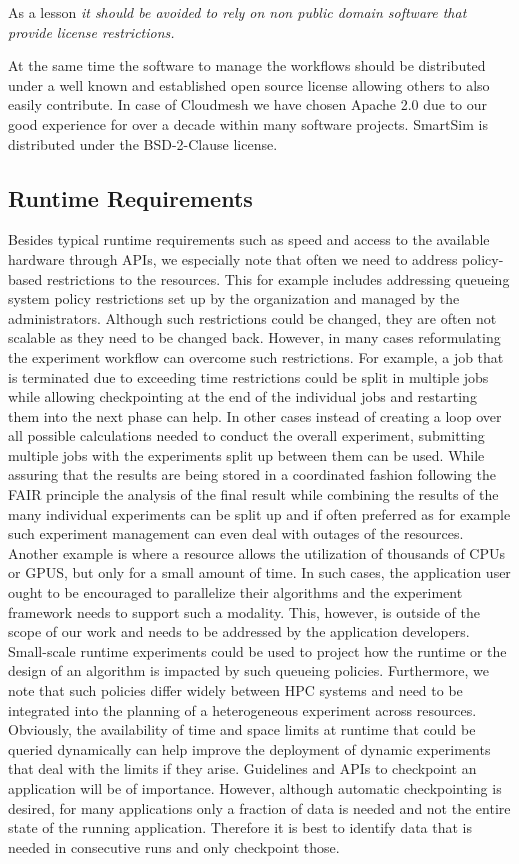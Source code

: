 \documentclass[utf8]{FrontiersinVancouver} %
\begin{document}
As a lesson {\em it should be avoided to rely on non public domain software that provide license restrictions.}

At the same time the software to manage the workflows should be distributed under a well known and established open source license allowing others to also easily contribute. In case of Cloudmesh we have chosen Apache 2.0 due to our good experience for over a decade within many software projects.
SmartSim is distributed under the BSD-2-Clause license.


\subsection{Runtime Requirements}

Besides typical runtime requirements such as speed and access to the available hardware through APIs, we especially note that often we need to address policy-based restrictions to the resources. This for example includes addressing queueing system policy restrictions set up by the organization and managed by the administrators. Although such restrictions could be changed, they are often not scalable as they need to be changed back. However, in many cases reformulating the experiment workflow can overcome such restrictions. For example, a job that is terminated due to exceeding time restrictions could be split in multiple jobs while allowing checkpointing at the end of the individual jobs and restarting them into the next phase can help. In other cases instead of creating a loop over all possible calculations needed to conduct the overall experiment, submitting multiple jobs with the experiments split up between them can be used. While assuring that the results are being stored in a coordinated fashion following the FAIR principle the analysis of the final result while combining the results of the many individual experiments can be split up and if often preferred as for example such experiment management can even deal with outages of the resources. Another example is where a resource allows the utilization of thousands of CPUs or GPUS, but only for a small amount of time. In such cases, the application user ought to be encouraged to parallelize their algorithms and the experiment framework needs to support such a modality. This, however, is outside of the scope of our work and needs to be addressed by the application developers. Small-scale runtime experiments could be used to project how the runtime or the design of an algorithm is impacted by such queueing policies.
Furthermore, we note that such policies differ widely between HPC systems and need to be integrated into the planning of a heterogeneous experiment across resources. Obviously, the availability of time and space limits at runtime that could be queried dynamically can help improve the deployment of dynamic experiments that deal with the limits if they arise. Guidelines and APIs to checkpoint an application will be of importance. However, although automatic checkpointing is desired, for many applications only a fraction of data is needed and not the entire state of the running application. Therefore it is best to identify data that is needed in consecutive runs and only checkpoint those.
\end{document}
